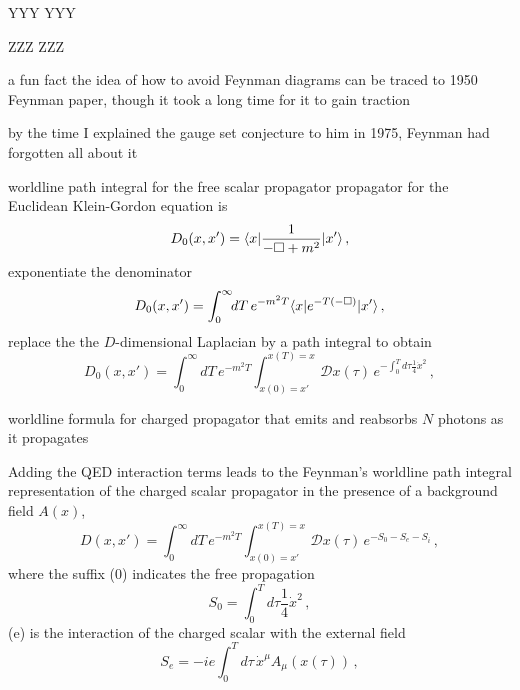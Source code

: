 \begin{frame}{YYY}
YYY
\end{frame}
\begin{frame}{ZZZ}
ZZZ
\end{frame}


\begin{frame}{a fun fact}
the idea of how to avoid Feynman diagrams can be traced to 1950 Feynman
paper, though it took a long time for it to gain
traction

\bigskip

by the time I explained the gauge set conjecture to
him in 1975, Feynman had forgotten all about it
\end{frame}

\begin{frame}{worldline path integral for the free scalar propagator}
propagator for the Euclidean
Klein-Gordon equation is
\[ %
D_0(x,x')=\bra{x}\frac{1}{-\Box +m^2}\ket{x'}
\,,
\] %
exponentiate the
denominator
\[ %
D_0(x,x')=\int_0^\infty\!\!dT\,{e}^{-m^2T}\bra{x}e^{-T(-\Box)}\ket{x'}
\,,
\] %
replace the the $D$-dimensional Laplacian by a path integral
to obtain
\[ %
D_0(x,x')=\int_0^\infty\!\!dT\,e^{-m^2T}
\int_{x(0)=x'}^{x(T)=x}\!\!\!\!\mathcal{D}x(\tau)\,
    e^{-\int_0^T\!\!d\tau \frac{1}{4}\dot{x}^2}
\,,
\] %
\end{frame}

\begin{frame}{worldline formula for charged propagator}
that emits and reabsorbs $N$ photons as it
propagates%

\medskip

Adding the QED
interaction terms leads to the Feynman's worldline path integral
representation of the charged scalar propagator
in the presence of a background field $A(x)$,
\[ %
D(x,x')=\int_0^\infty\!\!dT\,e^{-m^2T}
    \int_{x(0)=x'}^{x(T)=x}\!\!\mathcal{D}x(\tau)\,
            {e}^{-S_0-S_e-S_i}
\,,
\] %
where the suffix (0) indicates the free propagation
\[ %
S_0 = \int_0^T\!\!d\tau \frac{1}{4}\dot{x}^2
\,,
\] %
(e) is the interaction of the charged scalar with the external field
\[ %
S_e = -ie\int_0^T\!\!d\tau\,\dot{x}^\mu A_\mu(x(\tau))
\,,
\] %
\end{frame}

